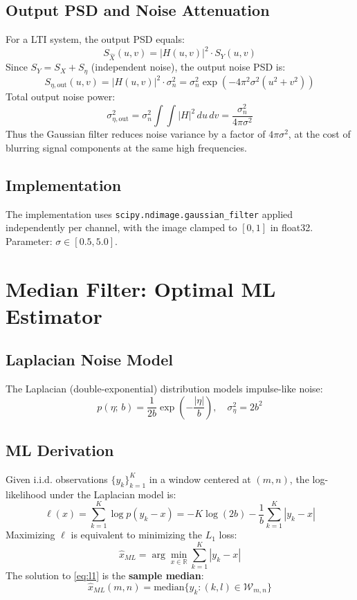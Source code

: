 \documentclass[10pt,conference]{IEEEtran}
\begin{document}
\subsection{Output PSD and Noise Attenuation}
For a LTI system, the output PSD equals:
\begin{equation}
S_{\hat{X}}(u,v) = |H(u,v)|^2 \cdot S_Y(u,v)
\end{equation}
Since $S_Y = S_X + S_\eta$ (independent noise), the output noise PSD is:
\begin{equation}
S_{\eta,\text{out}}(u,v) = |H(u,v)|^2 \cdot \sigma_n^2 = \sigma_n^2 \exp\!\left(-4\pi^2\sigma^2(u^2+v^2)\right)
\end{equation}
Total output noise power:
\begin{equation}
\sigma_{\eta,\text{out}}^2 = \sigma_n^2 \int\!\!\int |H|^2\,du\,dv = \frac{\sigma_n^2}{4\pi\sigma^2}
\end{equation}
Thus the Gaussian filter reduces noise variance by a factor of $4\pi\sigma^2$, at the cost of blurring signal components at the same high frequencies.

\subsection{Implementation}
The implementation uses \texttt{scipy.ndimage.gaussian\_filter} applied independently per channel, with the image clamped to $[0,1]$ in float32. Parameter: $\sigma \in [0.5, 5.0]$.

\section{Median Filter: Optimal ML Estimator}

\subsection{Laplacian Noise Model}
The Laplacian (double-exponential) distribution models impulse-like noise:
\begin{equation}
p(\eta;\,b) = \frac{1}{2b}\exp\!\left(-\frac{|\eta|}{b}\right), \quad \sigma_\eta^2 = 2b^2
\end{equation}

\subsection{ML Derivation}
Given i.i.d. observations $\{y_k\}_{k=1}^{K}$ in a window centered at $(m,n)$, the log-likelihood under the Laplacian model is:
\begin{equation}
\ell(x) = \sum_{k=1}^{K} \log p(y_k - x) = -K\log(2b) - \frac{1}{b}\sum_{k=1}^{K}|y_k - x|
\end{equation}
Maximizing $\ell$ is equivalent to minimizing the $L_1$ loss:
\begin{equation}
\hat{x}_{ML} = \arg\min_{x \in \mathbb{R}} \sum_{k=1}^{K} |y_k - x|
\label{eq:l1}
\end{equation}
The solution to \eqref{eq:l1} is the \textbf{sample median}:
\begin{equation}
\hat{x}_{ML}(m,n) = \mathrm{median}\{y_k : (k,l) \in \mathcal{W}_{m,n}\}
\end{equation}
\end{document}
